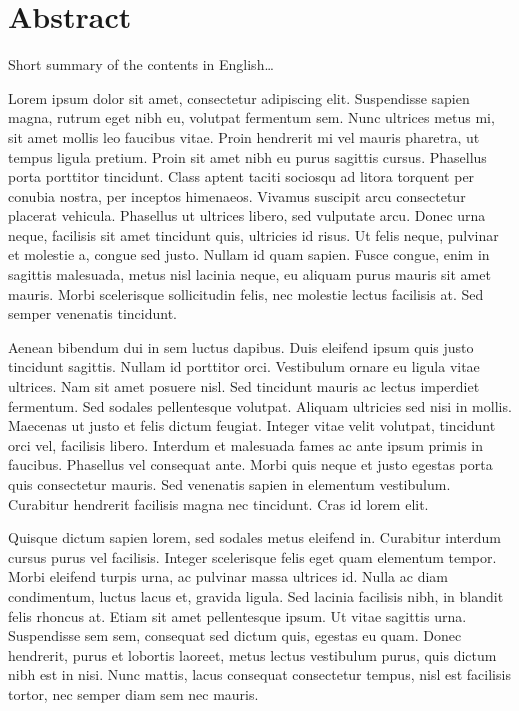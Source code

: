 \begingroup
\let\clearpage\relax
\let\cleardoublepage\relax
\let\cleardoublepage\relax

\chapter*{Abstract}
Short summary of the contents in English\dots

Lorem ipsum dolor sit amet, consectetur adipiscing elit. Suspendisse sapien magna, rutrum eget nibh eu, volutpat fermentum sem. Nunc ultrices metus mi, sit amet mollis leo faucibus vitae. Proin hendrerit mi vel mauris pharetra, ut tempus ligula pretium. Proin sit amet nibh eu purus sagittis cursus. Phasellus porta porttitor tincidunt. Class aptent taciti sociosqu ad litora torquent per conubia nostra, per inceptos himenaeos. Vivamus suscipit arcu consectetur placerat vehicula. Phasellus ut ultrices libero, sed vulputate arcu. Donec urna neque, facilisis sit amet tincidunt quis, ultricies id risus. Ut felis neque, pulvinar et molestie a, congue sed justo. Nullam id quam sapien. Fusce congue, enim in sagittis malesuada, metus nisl lacinia neque, eu aliquam purus mauris sit amet mauris. Morbi scelerisque sollicitudin felis, nec molestie lectus facilisis at. Sed semper venenatis tincidunt.


Aenean bibendum dui in sem luctus dapibus. Duis eleifend ipsum quis justo tincidunt sagittis. Nullam id porttitor orci. Vestibulum ornare eu ligula vitae ultrices. Nam sit amet posuere nisl. Sed tincidunt mauris ac lectus imperdiet fermentum. Sed sodales pellentesque volutpat. Aliquam ultricies sed nisi in mollis. Maecenas ut justo et felis dictum feugiat. Integer vitae velit volutpat, tincidunt orci vel, facilisis libero. Interdum et malesuada fames ac ante ipsum primis in faucibus. Phasellus vel consequat ante. Morbi quis neque et justo egestas porta quis consectetur mauris. Sed venenatis sapien in elementum vestibulum. Curabitur hendrerit facilisis magna nec tincidunt. Cras id lorem elit.


Quisque dictum sapien lorem, sed sodales metus eleifend in. Curabitur interdum cursus purus vel facilisis. Integer scelerisque felis eget quam elementum tempor. Morbi eleifend turpis urna, ac pulvinar massa ultrices id. Nulla ac diam condimentum, luctus lacus et, gravida ligula. Sed lacinia facilisis nibh, in blandit felis rhoncus at. Etiam sit amet pellentesque ipsum. Ut vitae sagittis urna. Suspendisse sem sem, consequat sed dictum quis, egestas eu quam. Donec hendrerit, purus et lobortis laoreet, metus lectus vestibulum purus, quis dictum nibh est in nisi. Nunc mattis, lacus consequat consectetur tempus, nisl est facilisis tortor, nec semper diam sem nec mauris.


